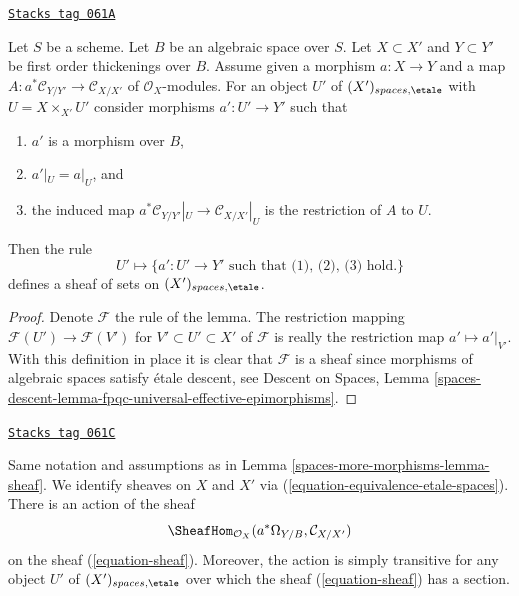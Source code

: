 \begin{lemma}[Sheaf]
\label{spaces-more-morphisms-lemma-sheaf}
\href{https://stacks.math.columbia.edu/tag/061A}{\texttt{Stacks tag 061A}}

Let $S$ be a scheme. Let $B$ be an algebraic space over $S$.
Let $X \subset X'$ and $Y \subset Y'$ be first order thickenings
over $B$. Assume given a morphism $a : X \to Y$ and a map
$A : a^*\mathcal{C}_{Y/Y'} \to \mathcal{C}_{X/X'}$ of
$\mathcal{O}_X$-modules. For an object $U'$ of
$(X')_{spaces, \etale}$ with $U = X \times_{X'} U'$
consider morphisms $a' : U' \to Y'$ such that
\begin{enumerate}
\item $a'$ is a morphism over $B$,
\item $a'|_U = a|_U$, and
\item the induced map
$a^*\mathcal{C}_{Y/Y'}|_U \to \mathcal{C}_{X/X'}|_U$
is the restriction of $A$ to $U$.
\end{enumerate}
Then the rule
\begin{equation}
\label{equation-sheaf}
U' \mapsto
\{a' : U' \to Y'\text{ such that (1), (2), (3) hold.}\}
\end{equation}
defines a sheaf of sets on $(X')_{spaces, \etale}$.
\end{lemma}

\begin{proof}
Denote $\mathcal{F}$ the rule of the lemma.
The restriction mapping $\mathcal{F}(U') \to \mathcal{F}(V')$ for
$V' \subset U' \subset X'$
of $\mathcal{F}$ is really the restriction map $a' \mapsto a'|_{V'}$.
With this definition in place it is clear that $\mathcal{F}$ is a
sheaf since morphisms of algebraic spaces satisfy \'etale descent, see
Descent on Spaces,
Lemma \ref{spaces-descent-lemma-fpqc-universal-effective-epimorphisms}.
\end{proof}

\begin{lemma}
\label{spaces-more-morphisms-lemma-action-sheaf}
\href{https://stacks.math.columbia.edu/tag/061C}{\texttt{Stacks tag 061C}}

Same notation and assumptions as in Lemma \ref{spaces-more-morphisms-lemma-sheaf}.
We identify sheaves on $X$ and $X'$ via
(\ref{equation-equivalence-etale-spaces}).
There is an action of the sheaf
$$
\SheafHom_{\mathcal{O}_X}(a^*\Omega_{Y/B}, \mathcal{C}_{X/X'})
$$
on the sheaf (\ref{equation-sheaf}). Moreover, the action
is simply transitive for any object $U'$ of $(X')_{spaces, \etale}$
over which the sheaf (\ref{equation-sheaf}) has a section.
\end{lemma}

